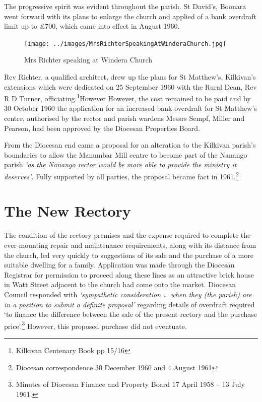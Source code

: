 The progressive spirit was evident throughout the parish. St David's, Boonara went forward with its plans to enlarge the church and applied of a bank overdraft limit up to \pounds700, which came into effect in August 1960.









\begin{figure}[!htb]
\begin{center}
\texttt{[image: ../images/MrsRichterSpeakingAtWinderaChurch.jpg]}
\caption{Mrs Richter speaking at Windera Church}
\end{center}
\end{figure}




Rev Richter, a qualified architect, drew up the plans for St Matthew's, Kilkivan's extensions which were dedicated on 25 September 1960 with the Rural Dean, Rev R D Turner, officiating.\footnote{Kilkivan Centenary Book pp 15/16}However However, the cost remained to be paid and by 30 October 1960 the application for an increased bank overdraft for St Matthew's centre, authorised by the rector and parish wardens Messrs Sempf, Miller and Pearson, had been approved by the Diocesan Properties Board.


From the Diocesan end came a proposal for an alteration to the Kilkivan parish's boundaries to allow the Manumbar Mill centre to become part of the Nanango parish \emph{`as the Nanango rector would be more able to provide the ministry it deserves'}. Fully supported by all parties, the proposal became fact in 1961.\footnote{Diocesan correspondence 30 December 1960 and 4 August 1961}


\section{The New Rectory}



The condition of the rectory premises and the expense required to complete the ever-mounting repair and maintenance requirements, along with its distance from the church, led very quickly to suggestions of its sale and the purchase of a more suitable dwelling for a family. Application was made through the Diocesan Registrar for permission to proceed along these lines as an attractive brick house in Watt Street adjacent to the church had come onto the market. Diocesan Council responded with \emph{`sympathetic consideration \ldots{} when they (the parish) are in a position to submit a definite proposal'} regarding details of overdraft required `to finance the difference between the sale of the present rectory and the purchase price'.\footnote{Minutes of Diocesan Finance and Property Board 17 April 1958 -- 13 July 1961.} However, this proposed purchase did not eventuate.








